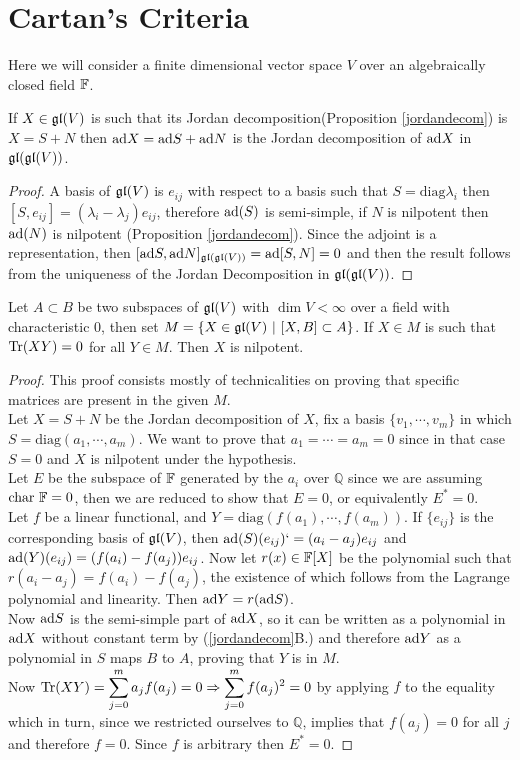\section{Cartan's Criteria}
Here we will consider a finite dimensional vector space $V$ over an algebraically closed field $\mathbb{F}$.
\begin{prop}
	If $X \in \mathfrak{gl}(V)$ is such that its Jordan decomposition(Proposition \ref{jordandecom}) is $X=S+N$ then $\text{ad} X = \text{ad} S + \text{ad} N$ is the Jordan decomposition of $\text{ad} X$ in $\mathfrak{gl}(\mathfrak{gl}(V))$.
\end{prop}
\begin{proof}
	A basis of $\mathfrak{gl}(V)$ is $e_{ij}$ with respect to a basis such that $S= \text{diag}{\lambda_i}$ then $[S,e_{ij}]=(\lambda_i-\lambda_j)e_{ij}$, therefore $\text{ad}(S)$ is semi-simple, if $N$ is nilpotent then $\text{ad}(N)$ is nilpotent (Proposition \ref{jordandecom}). Since the adjoint is a representation, then $[\text{ad} S,\text{ad} N]_{\mathfrak{gl}(\mathfrak{gl}(V))} = \text{ad}[S,N] = 0$ and then the result follows from the uniqueness of the Jordan Decomposition in $\mathfrak{gl}(\mathfrak{gl}(V))$.
\end{proof}
\begin{teo}
	Let $A \subset B$ be two subspaces of $\mathfrak{gl}(V)$ with $\dim V < \infty$ over a field with characteristic $0$, then set $M=\{X \in \mathfrak{gl}(V)\ |\ [X,B]\subset A\}$. If $X \in M$ is such that $\text{Tr}(XY)=0$ for all $Y \in M$. Then $X$ is nilpotent.
	\label{Cartan's Lemma}
\end{teo}
\begin{proof}
	This proof consists mostly of technicalities on proving that specific matrices are present in the given $M$.\\ 
	Let $X=S+N$ be the Jordan decomposition of $X$, fix a basis $\{v_1,\cdots,v_m\}$ in which $S=\text{diag}(a_1,\cdots,a_m)$. We want to prove that $a_1=\cdots=a_m=0$ since in that case $S=0$ and $X$ is nilpotent under the hypothesis.\\
	Let $E$ be the subspace of $\mathbb{F}$ generated by the $a_i$ over $\mathbb{Q}$ since we are assuming $\text{char } \mathbb{F}= 0$, then we are reduced to show that $E=0$, or equivalently $E^*=0$.\\
	Let $f$ be a linear functional, and $Y=\text{diag}(f(a_1),\cdots,f(a_m))$. If $\{e_{ij}\}$ is the corresponding basis of $\mathfrak{gl}(V)$, then $\text{ad}(S)(e_{ij})` = (a_i-a_j)e_{ij}$ and $\text{ad}(Y)(e_{ij}) = (f(a_i)-f(a_j))e_{ij}$. Now let $r(x)\in\mathbb{F}[X]$ be the polynomial such that $r(a_i-a_j)=f(a_i)-f(a_j)$, the existence of which follows from the Lagrange polynomial and linearity. Then $\text{ad} Y = r(\text{ad} S)$.\\
	Now $\text{ad} S$ is the semi-simple part of $\text{ad} X$, so it can be written as a polynomial in $\text{ad} X$ without constant term by (\ref{jordandecom}B.) and therefore $\text{ad} Y$ as a polynomial in $S$ maps $B$ to $A$, proving that $Y$ is in $M$.\\
	Now $\text{Tr}(XY)=\displaystyle\sum_{j=0}^m a_jf(a_j)=0 \Rightarrow \displaystyle\sum_{j=0}^m f(a_j)^2 =0$ by applying $f$ to the equality which in turn, since we restricted ourselves to $\mathbb{Q}$, implies that $f(a_j)=0$ for all $j$ and therefore $f=0$. Since $f$ is arbitrary then $E^*=0$.
\end{proof}	\\
